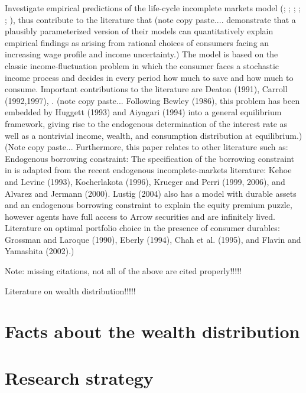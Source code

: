 \documentclass[a4paper,12pt]{article}
\begin{document}
Investigate empirical predictions of the life-cycle incomplete markets model (\cite{Gourinchas&Parker2002}; \cite{cagetti2003}; \cite{castaneda2003}; \cite{yang2009}; \cite{kaplan2010}; \cite{hintermaier2011}), thus contribute to the literature that (note copy paste.... demonstrate that a plausibly parameterized version of their models can quantitatively explain empirical findings as arising from rational choices of consumers facing an increasing wage profile and income uncertainty.)
The model is based on the classic income-fluctuation problem in which the consumer faces a stochastic income process and decides in every period how much to save and how much to consume. Important contributions to the literature are Deaton (1991), Carroll (1992,1997), \cite{Gourinchas&Parker2002}. (note copy paste... Following Bewley (1986), this problem has been embedded by Huggett (1993) and Aiyagari (1994) into a general equilibrium framework, giving rise to the endogenous determination of the interest rate as well as a nontrivial income, wealth, and consumption distribution at equilibrium.)
(Note copy paste... Furthermore, this paper relates to other literature such as: 
Endogenous borrowing constraint: The specification of the borrowing constraint  in \cite{FV&K2011} is adapted from the recent endogenous incomplete-markets literature: Kehoe and Levine (1993), Kocherlakota (1996), Krueger and Perri (1999, 2006), and Alvarez and Jermann (2000). Lustig (2004) also has a model with durable assets and an endogenous borrowing constraint to explain the equity premium puzzle, however agents have full access to Arrow securities and are infinitely lived.
Literature on optimal portfolio choice in the presence of consumer durables: Grossman and Laroque (1990), Eberly (1994), Chah et al. (1995), and Flavin and Yamashita (2002).)

Note: missing citations, not all of the above are cited properly!!!!!

Literature on wealth distribution!!!!! 

\section{Facts about the wealth distribution}

\section{Research strategy}
\end{document}
